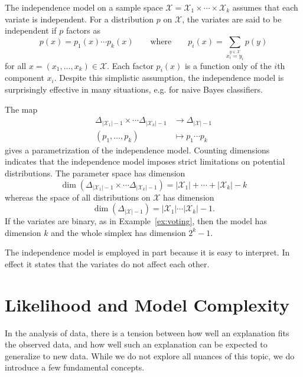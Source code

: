 \documentclass[cclicense]{hmcthesis}
\providecommand*{\xs}{\mathcal X}
\numberwithin{equation}{chapter}
\numberwithin{thmcounter}{chapter}
\begin{document}
    \begin{example}[Independence]
        The independence model on a sample space $\xs = \xs_1 \times \cdots
        \times \xs_k$ assumes that each variate is independent.  For a
        distribution $p$ on $\xs$, the variates are said to be independent if
        $p$ factors as
        \[
            p(x) = p_1(x) \cdots p_k(x)
            \qquad
            \text{where}
            \qquad
            p_i(x) = \sum_{\stackrel{y \in \xs}{x_i = y_i}} p(y)
        \]
        for all $x = (x_1, \ldots, x_k) \in \xs$.  Each factor $p_i(x)$ is a
        function only of the $i$th component $x_i$.  Despite this simplistic
        assumption, the independence model is surprisingly effective in many
        situations, e.g. for naive Bayes classifiers.  
        
        The map 
        \begin{align*}
        \Delta_{|\xs_1|-1} \times \cdots \Delta_{|\xs_k|-1} 
        &\to \Delta_{|\xs| - 1} \\
        (p_1, \ldots, p_k) &\mapsto p_1 \cdots p_k
        \end{align*}
        gives a parametrization of the independence model.  Counting dimensions
        indicates that the independence model imposes strict limitations on
        potential distributions.  The parameter space has dimension
        \[
            \dim 
            (\Delta_{|\xs_1|-1} \times \cdots \Delta_{|\xs_k|-1})
            =
            |\xs_1| + \cdots + |\xs_k| - k
        \]
        whereas the space of all distributions on $\xs$ has dimension 
        \[
            \dim(\Delta_{|\xs| - 1})
            =
            |\xs_1| \cdots |\xs_k| - 1.
        \]
        If the variates are binary, as in Example~\ref{ex:voting}, then the
        model has dimension $k$ and the whole simplex has dimension $2^k - 1$.
        
        The independence model is employed in part because it is easy to
        interpret.  In effect it states that the variates do not affect each
        other.
        \label{ex:independence1}
    \end{example}
    
\section{Likelihood and Model Complexity}
    In the analysis of data, there is a tension between how well an explanation
    fits the observed data, and how well such an explanation can be expected to
    generalize to new data.  While we do not explore all nuances of this topic,
    we do introduce a few fundamental concepts.
\end{document}

